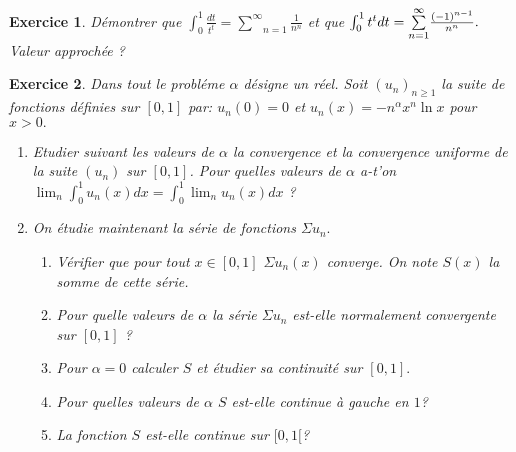 \documentclass[12pt,a4paper]{article}
\theoremstyle{break}
\theoremstyle{break}
\newtheorem{Exo}{Exercice}
\begin{document}
\begin{Exo}
	D\'{e}montrer que $\int_{0}^{1}\frac{dt}{t^{t}}=\underset{n=1}{\overset%
		{\infty }{\sum }}\frac{1}{n^{n}}$ et que $\int_{0}^{1}t^{t}dt=\underset{n=1}{%
		\overset{\infty }{\sum }}\frac{(-1)^{n-1}}{n^{n}}.$ Valeur approch\'{e}e ?
	
\end{Exo}
\begin{Exo}
	Dans tout le probl\'{e}me $\alpha $ d\'{e}signe un r\'{e}el. Soit $%
	\left( u_{n}\right) _{n\geq 1}$ la suite de fonctions d\'{e}finies sur $%
	\left[ 0,1\right] $ par: $u_{n}(0)=0$ et $u_{n}(x)=-n^{\alpha }x^{n}\ln
 x $ pour $x>0.$
	
	\begin{enumerate}
		\item Etudier suivant les valeurs de $\alpha $ la convergence et la
		convergence uniforme de la suite $\left( u_{n}\right) $ sur $[0,1]$. Pour
		quelles valeurs de $\alpha $ a-t'on $\lim_{n}\int_{0}^{1}u_{n}(x)dx=%
		\int_{0}^{1}\lim_{n}u_{n}(x)dx$ ?
		
		\item On étudie maintenant la série de fonctions $\Sigma u_{n}.$
		
		\begin{enumerate}
			\item Vérifier que pour tout $x\in \left[ 0,1\right] $ $
			\Sigma u_{n}(x)$ converge. On note $S(x)$ la somme de cette s\'{e}rie.
			
			\item Pour quelle valeurs de $\alpha $ la s\'{e}rie $\Sigma u_{n}$ est-elle
			normalement convergente sur $[0,1]$ ?
			
			\item Pour $\alpha =0$ calculer $S$ et \'{e}tudier sa continuit\'{e} sur $%
			[0,1].$
			
			\item Pour quelles valeurs de $\alpha $ $S$ est-elle continue \`{a} gauche
			en $1$?
			
			\item La fonction $S$ est-elle continue sur $[0,1[$?
		\end{enumerate}
	\end{enumerate}
\end{Exo}
%	
\end{document}
